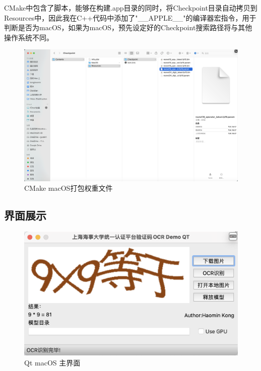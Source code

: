 CMake中包含了脚本，能够在构建.app目录的同时，将Checkpoint目录自动拷贝到Resources中，因此我在C++代码中添加了"\_\_APPLE\_\_"的编译器宏指令，用于判断是否为macOS，如果为macOS，预先设定好的Checkpoint搜索路径将与其他操作系统不同。

\begin{figure}
	\centering
	\includegraphics[width=0.9\linewidth]{Resources/Picture/Deploy/Qt/macOS/mac_bundle}
	\caption{CMake macOS打包权重文件}
	\label{fig:macbundle}
\end{figure}

\subsection{界面展示}

\begin{figure}
	\centering
	\includegraphics[width=0.9\linewidth]{Resources/Picture/Deploy/Qt/macOS/qt_mac_main}
	\caption{Qt macOS 主界面}
	\label{fig:qtmacmain}
\end{figure}

